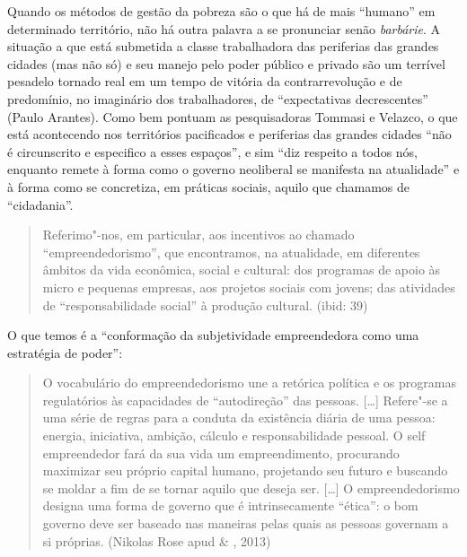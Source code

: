 Quando os métodos de gestão da pobreza são o que há de mais ``humano''
em determinado território, não há outra palavra a se pronunciar senão
\emph{barbárie}. A situação a que está submetida a classe trabalhadora
das periferias das grandes cidades (mas não só) e seu manejo pelo poder
público e privado são um terrível pesadelo tornado real em um tempo de
vitória da contrarrevolução e de predomínio, no imaginário dos
trabalhadores, de ``expectativas decrescentes'' (Paulo Arantes). Como
bem pontuam as pesquisadoras Tommasi e Velazco, o que está acontecendo
nos territórios pacificados e periferias das grandes cidades ``não é
circunscrito e especifico a esses espaços'', e sim ``diz respeito a
todos nós, enquanto remete à forma como o governo neoliberal se
manifesta na atualidade'' e à forma como se concretiza, em práticas
sociais, aquilo que chamamos de ``cidadania''.

\begin{quote}
Referimo"-nos, em particular, aos incentivos ao chamado
``empreendedorismo'', que encontramos, na atualidade, em diferentes
âmbitos da vida econômica, social e cultural: dos programas de apoio às
micro e pequenas empresas, aos projetos sociais com jovens; das
atividades de ``responsabilidade social'' à produção cultural. (ibid:
39)
\end{quote}

O que temos é a ``conformação da subjetividade empreendedora como uma
estratégia de poder'':

\begin{quote}
O vocabulário do empreendedorismo une a retórica política e os programas
regulatórios às capacidades de ``autodireção'' das pessoas. {[}\ldots{}{]}
Refere"-se a uma série de regras para a conduta da existência diária de
uma pessoa: energia, iniciativa, ambição, cálculo e responsabilidade
pessoal. O self empreendedor fará da sua vida um empreendimento,
procurando maximizar seu próprio capital humano, projetando seu futuro e
buscando se moldar a fim de se tornar aquilo que deseja ser. {[}\ldots{}{]} O
empreendedorismo designa uma forma de governo que é intrinsecamente
``ética'': o bom governo deve ser baseado nas maneiras pelas quais as
pessoas governam a si próprias. (Nikolas Rose apud  \& ,
2013)
\end{quote}

